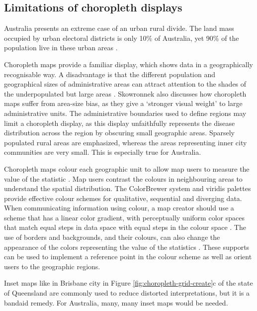 \documentclass{monashthesis}
\begin{document}
\hypertarget{chorolimit}{%
\subsection{Limitations of choropleth displays}\label{chorolimit}}

Australia presents an extreme case of an urban rural divide. The land mass occupied by urban electoral districts is only 10\% of Australia, yet 90\% of the population live in these urban areas \autocite{ACTUC}.

Choropleth maps provide a familiar display, which shows data in a geographically recognisable way. A disadvantage is that the different population and geographical sizes of administrative areas can attract attention to the shades of the underpopulated but large areas \autocite{EI}. Skowronnek also \autocite{BCM} discusses how choropleth maps suffer from area-size bias, as they give a `stronger visual weight' to large administrative units. The administrative boundaries used to define regions may limit a choropleth display, as this display unfaithfully represents the disease distribution across the region by obscuring small geographic areas. Sparsely populated rural areas are emphasized, whereas the areas representing inner city communities are very small. This is especially true for Australia.

Choropleth maps colour each geographic unit to allow map users to measure the value of the statistic \autocite{EI}. Map users contrast the colours in neighbouring areas to understand the spatial distribution. The ColorBrewer system \autocite{CB} and viridis \autocite{viridis} palettes provide effective colour schemes for qualitative, sequential and diverging data. When communicating information using colour, a map creator should use a scheme that has a linear color gradient, with perceptually uniform color spaces that match equal steps in data space with equal steps in the colour space \autocite{PUCS}.
The use of borders and backgrounds, and their colours, can also change the appearance of the colors representing the value of the statistics \autocite{CB}. These supports can be used to implement a reference point in the colour scheme as well as orient users to the geographic regions.

Inset maps like in Brisbane city in Figure \ref{fig:choropleth-grid-create}c of the state of Queensland are commonly used to reduce distorted interpretations, but it is a bandaid remedy. For Australia, many, many inset maps would be needed.
\end{document}
